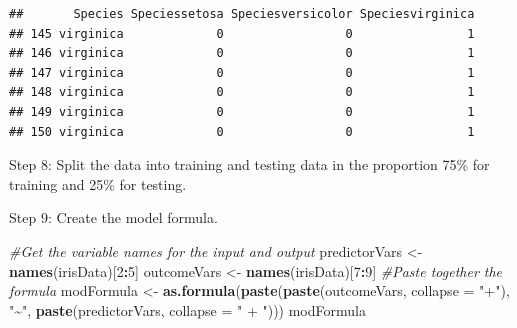 \documentclass[
]{article}
\newenvironment{Shaded}{\begin{snugshade}}{\end{snugshade}}
\newcommand{\AttributeTok}[1]{\textcolor[rgb]{0.13,0.29,0.53}{#1}}
\newcommand{\CommentTok}[1]{\textcolor[rgb]{0.56,0.35,0.01}{\textit{#1}}}
\newcommand{\ConstantTok}[1]{\textcolor[rgb]{0.56,0.35,0.01}{#1}}
\newcommand{\DecValTok}[1]{\textcolor[rgb]{0.00,0.00,0.81}{#1}}
\newcommand{\FloatTok}[1]{\textcolor[rgb]{0.00,0.00,0.81}{#1}}
\newcommand{\FunctionTok}[1]{\textcolor[rgb]{0.13,0.29,0.53}{\textbf{#1}}}
\newcommand{\NormalTok}[1]{#1}
\newcommand{\OtherTok}[1]{\textcolor[rgb]{0.56,0.35,0.01}{#1}}
\newcommand{\SpecialCharTok}[1]{\textcolor[rgb]{0.81,0.36,0.00}{\textbf{#1}}}
\newcommand{\StringTok}[1]{\textcolor[rgb]{0.31,0.60,0.02}{#1}}
\begin{document}
\begin{verbatim}
##       Species Speciessetosa Speciesversicolor Speciesvirginica
## 145 virginica             0                 0                1
## 146 virginica             0                 0                1
## 147 virginica             0                 0                1
## 148 virginica             0                 0                1
## 149 virginica             0                 0                1
## 150 virginica             0                 0                1
\end{verbatim}

Step 8: Split the data into training and testing data in the proportion
75\% for training and 25\% for testing.

\begin{Shaded}
\end{Shaded}

Step 9: Create the model formula.

\begin{Shaded}
\begin{Highlighting}[]
\CommentTok{\#Get the variable names for the input and output}
\NormalTok{predictorVars }\OtherTok{\textless{}{-}} \FunctionTok{names}\NormalTok{(irisData)[}\DecValTok{2}\SpecialCharTok{:}\DecValTok{5}\NormalTok{]}
\NormalTok{outcomeVars   }\OtherTok{\textless{}{-}} \FunctionTok{names}\NormalTok{(irisData)[}\DecValTok{7}\SpecialCharTok{:}\DecValTok{9}\NormalTok{]}
\CommentTok{\#Paste together the formula }
\NormalTok{modFormula }\OtherTok{\textless{}{-}} \FunctionTok{as.formula}\NormalTok{(}\FunctionTok{paste}\NormalTok{(}\FunctionTok{paste}\NormalTok{(outcomeVars, }\AttributeTok{collapse =} \StringTok{"+"}\NormalTok{),}
                               \StringTok{"\textasciitilde{}"}\NormalTok{, }\FunctionTok{paste}\NormalTok{(predictorVars, }\AttributeTok{collapse =} \StringTok{" + "}\NormalTok{)))}
\NormalTok{modFormula}
\end{Highlighting}
\end{Shaded}
\end{document}
